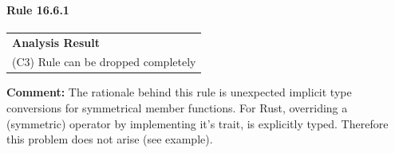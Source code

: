 \paragraph{Rule 16.6.1}
\begin{longtable}{p{13cm}}
\textbf{Analysis Result} \\
(C3) Rule can be dropped completely \\
\end{longtable}
\textbf{Comment:} The rationale behind this rule is unexpected implicit type conversions for symmetrical member functions. For Rust, overriding a (symmetric) operator by implementing it's trait, is explicitly typed. Therefore this problem does not arise (see example). \\


